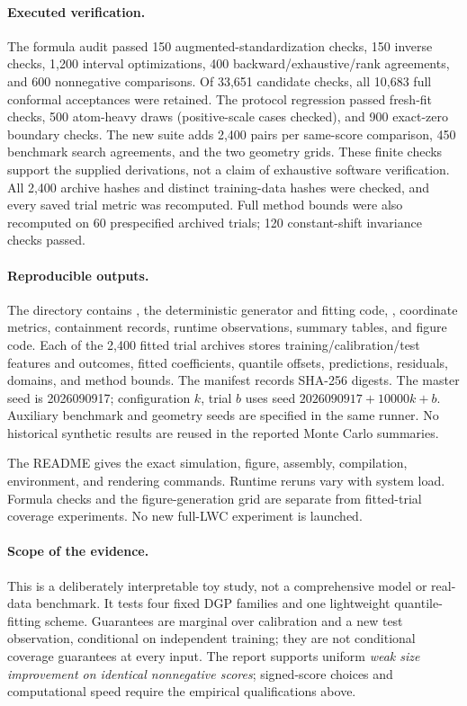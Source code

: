 \documentclass[11pt]{article}
\begin{document}
\paragraph{Executed verification.}
The formula audit passed 150 augmented-standardization checks, 150 inverse
checks, 1,200 interval optimizations, 400 backward/exhaustive/rank agreements,
and 600 nonnegative comparisons. Of 33,651 candidate checks, all 10,683 full
conformal acceptances were retained. The protocol regression passed fresh-fit
checks, 500 atom-heavy draws (positive-scale cases checked), and 900 exact-zero
boundary checks. The new suite adds 2,400 pairs per same-score comparison,
450 benchmark search agreements, and the two geometry grids. These finite
checks support the supplied derivations, not a claim of exhaustive software
verification.
All 2,400 archive hashes and distinct training-data hashes were checked, and
every saved trial metric was recomputed. Full method bounds were also
recomputed on 60 prespecified archived trials; 120 constant-shift invariance
checks passed.

\paragraph{Reproducible outputs.}
The directory  contains
, the deterministic generator and fitting code,
, coordinate metrics, containment records, runtime observations,
summary tables, and figure code. Each of the 2,400 fitted trial archives stores
training/calibration/test features and outcomes, fitted coefficients, quantile
offsets, predictions, residuals, domains, and method bounds. The manifest records
SHA-256 digests. The master seed is 2026090917; configuration $k$, trial $b$
uses seed $2026090917+10000k+b$. Auxiliary benchmark and geometry seeds are
specified in the same runner. No historical synthetic results are reused in
the reported Monte Carlo summaries.

The README gives the exact simulation, figure, assembly, compilation,
environment, and rendering commands. Runtime reruns vary
with system load. Formula checks and the figure-generation grid are separate
from fitted-trial coverage experiments. No new full-LWC experiment is launched.

\paragraph{Scope of the evidence.}
This is a deliberately interpretable toy study, not a comprehensive model or
real-data benchmark. It tests four fixed DGP families and one lightweight
quantile-fitting scheme. Guarantees are marginal over calibration and a new
test observation, conditional on independent training; they are not conditional
coverage guarantees at every input. The report supports uniform \emph{weak
size improvement on identical nonnegative scores}; signed-score choices and
computational speed require the empirical qualifications above.
\end{document}
